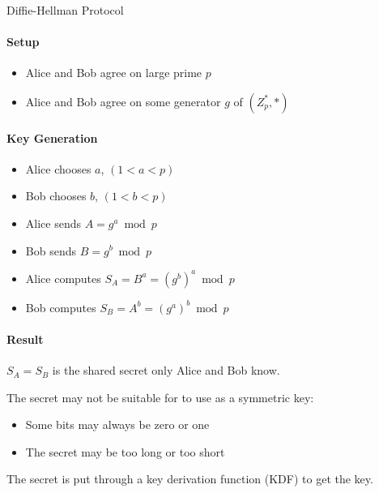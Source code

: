 \begin{KR}{Diffie-Hellman Protocol}\\
    \paragraph{Setup}
    \begin{itemize}
        \item Alice and Bob agree on large prime $p$
        \item Alice and Bob agree on some generator $g$ of $(Z_p^*, *)$
    \end{itemize}
    
    \paragraph{Key Generation}
    \begin{itemize}
        \item Alice chooses $a$, $(1 < a < p)$
        \item Bob chooses $b$, $(1 < b < p)$
        \item Alice sends $A = g^a \bmod p$
        \item Bob sends $B = g^b \bmod p$
        \item Alice computes $S_A = B^a = (g^b)^a \bmod p$
        \item Bob computes $S_B = A^b = (g^a)^b \bmod p$
    \end{itemize}
    
    \paragraph{Result}
    $S_A = S_B$ is the shared secret only Alice and Bob know.
\end{KR}


\begin{remark}
    The secret may not be suitable for to use as a symmetric key:
    \begin{itemize}
        \item Some bits may always be zero or one
        \item The secret may be too long or too short
    \end{itemize}
    
    The secret is put through a key derivation function (KDF) to get the key.
\end{remark}

